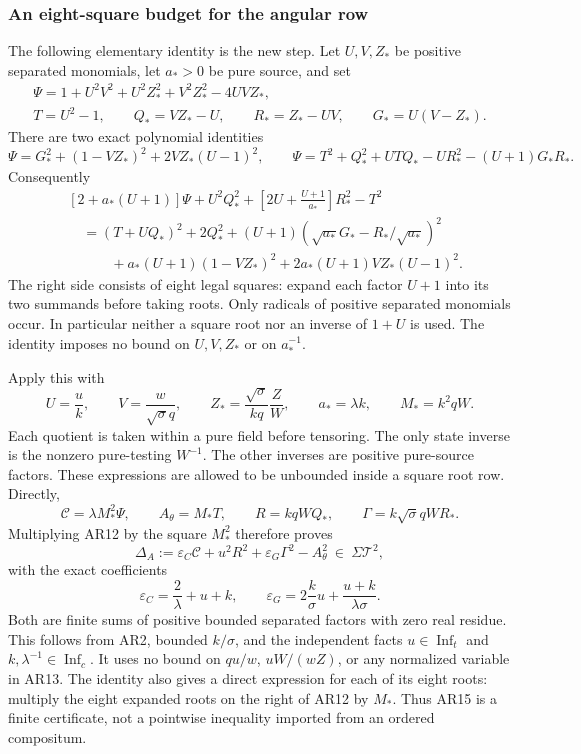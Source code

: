 \subsubsection*{An eight-square budget for the angular row}

The following elementary identity is the new step. Let $U,V,Z_*$
be positive separated monomials, let $a_*>0$ be pure source, and set
\[
 \begin{gathered}
 \Psi=1+U^2V^2+U^2Z_*^2+V^2Z_*^2-4UVZ_*,\\
 T=U^2-1,\qquad Q_*=VZ_*-U,\qquad
 R_*=Z_*-UV,\qquad G_*=U(V-Z_*).
 \end{gathered} \tag{AR10}
\]
There are two exact polynomial identities
\[
 \Psi=G_*^2+(1-VZ_*)^2+2VZ_*(U-1)^2,
 \qquad
 \Psi=T^2+Q_*^2+UTQ_*-UR_*^2-(U+1)G_*R_*.
 \tag{AR11}
\]
Consequently
\[
\boxed{\begin{aligned}
 &[2+a_*(U+1)]\Psi+U^2Q_*^2
       +\left[2U+\frac{U+1}{a_*}\right]R_*^2-T^2\\
 &\quad=(T+UQ_*)^2+2Q_*^2
       +(U+1)\left(\sqrt{a_*}G_*
                          -R_*/\sqrt{a_*}\right)^2\\
 &\qquad\quad+a_*(U+1)(1-VZ_*)^2
                     +2a_*(U+1)VZ_*(U-1)^2.
\end{aligned}} \tag{AR12}
\]
The right side consists of eight legal squares: expand each
factor $U+1$ into its two summands before taking roots. Only
radicals of positive separated monomials occur. In particular
neither a square root nor an inverse of $1+U$ is used. The
identity imposes no bound on $U,V,Z_*$ or on $a_*^{-1}$.

Apply this with
\[
 U=\frac uk,\qquad V=\frac w{\sqrt\sigma q},\qquad
 Z_* =\frac{\sqrt\sigma}{kq}\frac ZW,
 \qquad a_*=\lambda k,\qquad M_*=k^2qW.
 \tag{AR13}
\]
Each quotient is taken within a pure field before tensoring.
The only state inverse is the nonzero pure-testing $W^{-1}$.
The other inverses are positive pure-source factors. These
expressions are allowed to be unbounded inside a square root row.
Directly,
\[
 \mathscr C=\lambda M_*^2\Psi,\qquad
 A_\theta=M_*T,\qquad R=kqWQ_*,\qquad
 \Gamma=k\sqrt\sigma qWR_*.
 \tag{AR14}
\]
Multiplying AR12 by the square $M_*^2$ therefore proves
\[
\boxed{\quad
 \Delta_A:=\varepsilon_C\mathscr C+u^2R^2
                 +\varepsilon_G\Gamma^2-A_\theta^2
                         \ \in\ \Sigma\mathcal T^2,
 \quad} \tag{AR15}
\]
with the exact coefficients
\[
 \varepsilon_C=\frac2\lambda+u+k,\qquad
 \varepsilon_G=2\frac k\sigma u+
                         \frac{u+k}{\lambda\sigma}.
 \tag{AR16}
\]
Both are finite sums of positive bounded separated factors with
zero real residue. This follows from AR2, bounded $k/\sigma$,
and the independent facts $u\in\operatorname{Inf}_t$ and
$k,\lambda^{-1}\in\operatorname{Inf}_c$. It uses no bound on
$q u/w$, $uW/(wZ)$, or any normalized variable in AR13.
The identity also gives a direct expression for each of its eight
roots: multiply the eight expanded roots on the right of AR12
by $M_*$. Thus AR15 is a finite certificate, not a pointwise
inequality imported from an ordered compositum.

